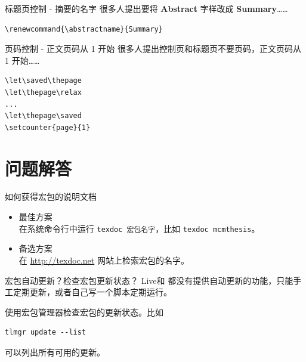 \documentclass{beamer}
\renewcommand{\TeX}{\hologo{TeX}}
\newcommand{\MiKTeX}{\hologo{MiKTeX}}
\newcommand{\TeXLive}{\TeX{} Live}
\begin{document}
\begin{frame}[fragile]{标题页控制 - 摘要的名字}
  很多人提出要将 \textbf{Abstract} 字样改成 \textbf{Summary}……
\begin{verbatim}
\renewcommand{\abstractname}{Summary}
\end{verbatim}
\end{frame}

\begin{frame}[fragile]{页码控制 - 正文页码从 1 开始}
  很多人提出控制页和标题页不要页码，正文页码从 1 开始……
\begin{verbatim}
\let\saved\thepage
\let\thepage\relax
...
\let\thepage\saved
\setcounter{page}{1}
\end{verbatim}
\end{frame}

\section{问题解答}

\begin{frame}
\end{frame}

\begin{frame}[fragile]{如何获得宏包的说明文档}
  \begin{itemize}
    \item 最佳方案\\
      在系统命令行中运行 \verb|texdoc 宏包名字|，比如 \verb|texdoc mcmthesis|。
    \item 备选方案\\
      在 \url{http://texdoc.net} 网站上检索宏包的名字。
  \end{itemize}
\end{frame}

\begin{frame}[fragile]{宏包自动更新？检查宏包更新状态？}
  \TeXLive 和 \MiKTeX 都没有提供自动更新的功能，只能手工定期更新，或者自己写一个脚本定期运行。

  使用宏包管理器检查宏包的更新状态。比如
\begin{verbatim}
tlmgr update --list
\end{verbatim}
  可以列出所有可用的更新。
\end{frame}
\end{document}
